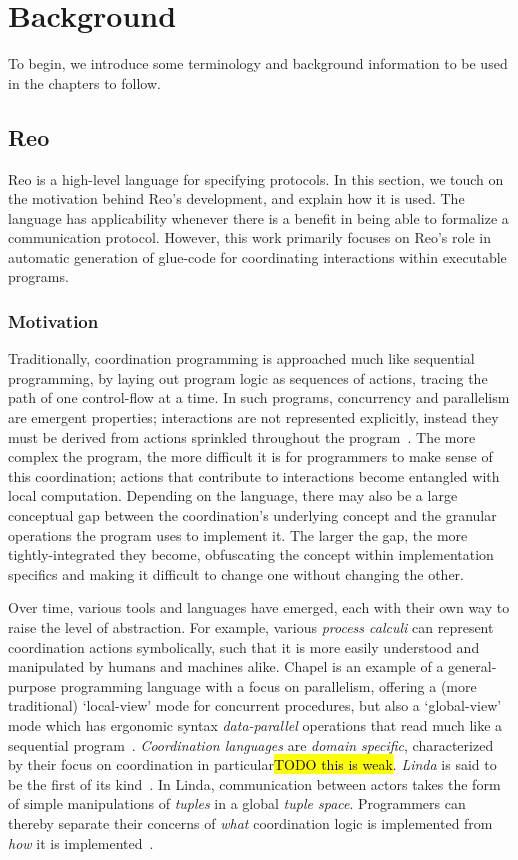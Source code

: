 
\chapter{Background}
\label{sec:background}
To begin, we introduce some terminology and background information to be used in the chapters to follow.

\section{Reo}
\label{sec:reo_background}
Reo is a high-level language for specifying protocols. In this section, we touch on the motivation behind Reo's development, and explain how it is used. The language has applicability whenever there is a benefit in being able to formalize a communication protocol. However, this work primarily focuses on Reo's role in automatic generation of glue-code for coordinating interactions within executable programs.  

\subsection{Motivation}
\label{sec:reo_motivation}
Traditionally, coordination programming is approached much like sequential programming, by laying out program logic as sequences of actions, tracing the path of one control-flow at a time. In such programs, concurrency and parallelism are emergent properties; interactions are not represented explicitly, instead they must be derived from actions sprinkled throughout the program~\cite{arbab2011puff}. The more complex the program, the more difficult it is for programmers to make sense of this coordination; actions that contribute to interactions become entangled with local computation. Depending on the language, there may also be a large conceptual gap between the coordination's underlying concept and the granular operations the program uses to implement it. The larger the gap, the more tightly-integrated they become, obfuscating the concept within implementation specifics and making it difficult to change one without changing the other.

Over time, various tools and languages have emerged, each with their own way to raise the level of abstraction. For example, various \textit{process calculi} can represent coordination actions symbolically, such that it is more easily understood and manipulated by humans and machines alike. Chapel is an example of a general-purpose programming language with a focus on parallelism, offering a (more traditional) `local-view' mode for concurrent procedures, but also a `global-view' mode which has ergonomic syntax \textit{data-parallel} operations that read much like a sequential program~\cite{chamberlain2007parallel}.
\textit{Coordination languages} are \textit{domain specific}, characterized by their focus on coordination in particular\hl{TODO this is weak}. \textit{Linda} is said to be the first of its kind~\cite{wells2005coordination}. In Linda, communication between actors takes the form of simple manipulations of \textit{tuples} in a global \textit{tuple space}. Programmers can thereby separate their concerns of \textit{what} coordination logic is implemented from \textit{how} it is implemented~\cite{gelernter1992coordination}.

